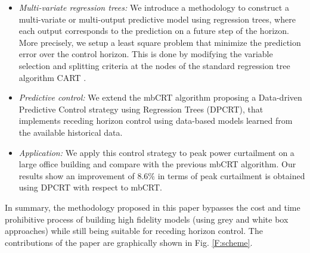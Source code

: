\begin{itemize}[leftmargin=0.5cm]
	\item \emph{Multi-variate regression trees:} We introduce a methodology to construct a multi-variate or multi-output predictive model using regression trees, where each output corresponds to the prediction on a future step of the horizon. More precisely, we setup a least square problem that minimize the prediction error over the control horizon. This is done by modifying the variable selection and splitting criteria at the nodes of the standard regression tree algorithm CART \cite{BreimanFriedmanStoneEtAl1984}.
	\item \emph{Predictive control:} We extend the mbCRT algorithm proposing a Data-driven Predictive Control strategy using Regression Trees (DPCRT), that implements receding horizon control using data-based models learned from the available historical data.
	\item \emph{Application:} We apply this control strategy to peak power curtailment on a large office building and compare with the previous mbCRT algorithm. Our results show an improvement of $8.6\%$ in terms of peak curtailment is obtained using DPCRT with respect to mbCRT.
\end{itemize}
In summary, the methodology proposed in this paper bypasses the cost and time prohibitive process of building high fidelity models (using grey and white box approaches) while still being suitable for receding horizon control. 
The contributions of the paper are graphically shown in Fig. \ref{F:scheme}.

